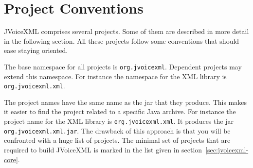 \documentclass[11pt,a4paper]{article}
\begin{document}
\section{Project Conventions}

JVoiceXML comprises several projects. Some of them are described in more
detail in the following section. All these projects follow some conventions
that should ease staying oriented.

The base namespace for all projects is \lstinline{org.jvoicexml}. Dependent 
projects may extend this namespace. For instance the namespace for the
XML library is \lstinline{org.jvoicexml.xml}.

The project names have the same name as the jar that they produce. This
makes it easier to find the project related to a specific Java archive.
For instance the project name for the XML library is
\lstinline{org.jvoicexml.xml}. It produces the jar
\texttt{org.jvoicexml.xml.jar}.
The drawback of this approach is that you will be confronted 
with a huge list of projects. The minimal set of projects
that are required to build JVoiceXML is marked in the list
given in section~\ref{sec:jvoicexml-core}.
\end{document}
